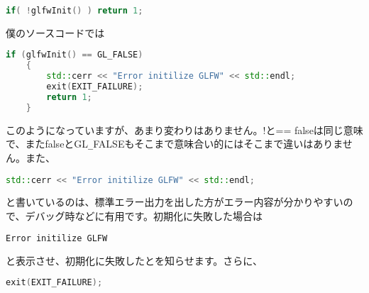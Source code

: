 \documentclass[a4paper,titlepage]{jsarticle}
\begin{document}
\begin{lstlisting}[language=C++]
if( !glfwInit() ) return 1;
\end{lstlisting}
僕のソースコードでは
\begin{lstlisting}[language=C++]
if (glfwInit() == GL_FALSE)
	{
		std::cerr << "Error initilize GLFW" << std::endl;
		exit(EXIT_FAILURE);
		return 1;
	}
\end{lstlisting}
このようになっていますが、あまり変わりはありません。!と== falseは同じ意味で、またfalseとGL\verb|_|FALSEもそこまで意味合い的にはそこまで違いはありません。また、
\begin{lstlisting}[language=C++]
std::cerr << "Error initilize GLFW" << std::endl;
\end{lstlisting}
と書いているのは、標準エラー出力を出した方がエラー内容が分かりやすいので、デバッグ時などに有用です。初期化に失敗した場合は
\begin{lstlisting}[language=bash]
Error initilize GLFW
\end{lstlisting}
と表示させ、初期化に失敗したとを知らせます。さらに、
\begin{lstlisting}[language=C++]
exit(EXIT_FAILURE);
\end{lstlisting}
\end{document}
